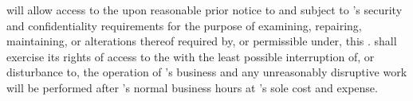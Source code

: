\lessee will allow \lessor access to the \premises upon reasonable prior notice to \lessee and subject to \lessee's security and confidentiality requirements for the purpose of examining, repairing, maintaining, or alterations thereof required by, or permissible under, this \lease. \lessor shall exercise its rights of access to the \premises with the least possible interruption of, or disturbance to, the operation of \lessee's business and any unreasonably disruptive work will be performed after \lessee's normal business hours at \lessor's sole cost and expense.

